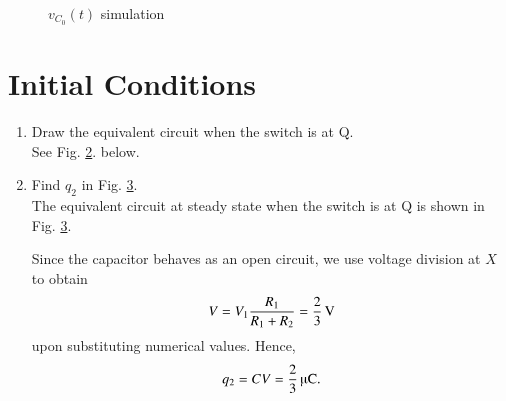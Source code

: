 \documentclass[journal,12pt,twocolumn]{IEEEtran}
\renewcommand\thesection{\arabic{section}}
\begin{document}
\begin{enumerate}[label=\arabic*.,ref=\thesection.\theenumi]
\begin{figure}[!htb]
    \caption{$v_{C_0}(t)$ simulation}
    \label{fig:cktsig/v1-sim-t}
\end{figure}
\end{enumerate}

\section{Initial Conditions}
\begin{enumerate}[label=\arabic*.,ref=\thesection.\theenumi]
\item Draw the equivalent circuit when the switch is at Q. 
	\\
		\solution See Fig. 
\ref{fig:cktsig/ckt-q2}.
below.
\begin{figure}[!htb]
	    \centering
	
\caption{}
\label{fig:cktsig/ckt-q2}
\end{figure}
\item Find $q_2$ in Fig. 
    \ref{fig:cktsig/ckt-q2-steady}.
\\
\solution The equivalent circuit at steady state when the switch is at Q is shown
in Fig.
    \ref{fig:cktsig/ckt-q2-steady}.
\begin{figure}[!h]
	\centering
	
    \caption{}
    \label{fig:cktsig/ckt-q2-steady}
\end{figure}
Since the capacitor behaves as an open circuit, we use voltage division at $X$ to obtain
\begin{align}
	V = V_1\frac{R_1}{R_1+R_2}=\SI[parse-numbers=false]{\frac{2}{3}}{\V}
\end{align}                                         
upon substituting numerical values.  Hence, 
\begin{align}
q_2 = CV = \SI[parse-numbers=false]{\frac{2}{3}}{\micro\coulomb}.
\end{align}


\end{enumerate}
\end{document}
